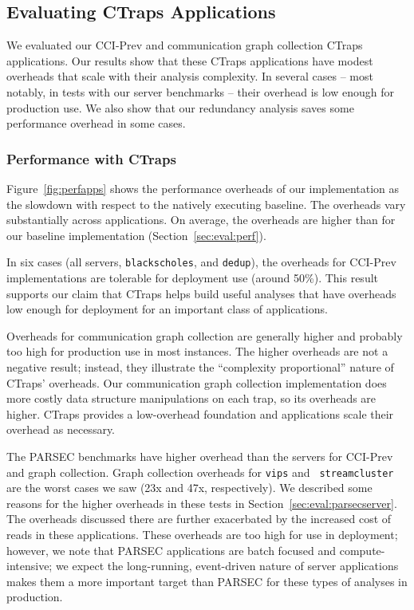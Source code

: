 \documentclass[preprint,9pt]{sigplanconf}
\newcommand{\ctraps}{CTraps\xspace}
\newcommand{\ctrapsmm}{CTraps-NRR\xspace}
\begin{document}
\subsection{Evaluating CTraps Applications}
\label{sec:appperf}
We evaluated our CCI-Prev and communication graph collection CTraps
applications.  Our results show that these CTraps applications have modest
overheads that scale with their analysis complexity.  In several cases -- most
notably, in tests with our server benchmarks -- their overhead is low enough
for production use.  We also show that our redundancy analysis saves some
performance overhead in some cases.

\subsubsection{Performance with \ctraps}
Figure~\ref{fig:perfapps} shows the performance overheads of our implementation
as the slowdown with respect to the natively executing baseline.  The overheads
vary substantially across applications.  On average, the overheads are higher
than for our baseline implementation (Section~\ref{sec:eval:perf}).  

In six cases (all servers, {\tt blackscholes}, and {\tt dedup}), the overheads
for CCI-Prev implementations are tolerable for deployment use (around 50\%).
This result supports our claim that \ctraps helps build useful analyses that
have overheads low enough for deployment for an important class of
applications.  

Overheads for communication graph collection are generally higher and probably
too high for production use in most instances.  The higher overheads are not a
negative result; instead, they illustrate the ``complexity proportional''
nature of \ctraps' overheads.  Our communication graph collection
implementation does more costly data structure manipulations on each trap, so
its overheads are higher.  \ctraps provides a low-overhead foundation and
applications scale their overhead as necessary. 



The PARSEC benchmarks have higher overhead than the servers for CCI-Prev and
graph collection.  Graph collection overheads for {\tt vips} and {\tt
streamcluster} are the worst cases we saw (23x and 47x, respectively).  We
described some reasons for the higher overheads in these tests in
Section~\ref{sec:eval:parsecserver}.  The overheads discussed there are further
exacerbated by the increased cost of reads in these applications.  These
overheads are too high for use in deployment;  however, we note that PARSEC
applications are batch focused and compute-intensive; we expect the
long-running, event-driven nature of server applications makes them a more
important target than PARSEC for these types of analyses in production.  
\end{document}
